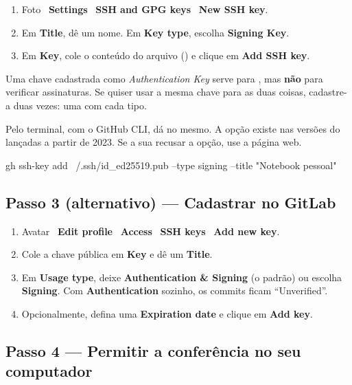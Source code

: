 \begin{enumerate}
  \item Foto \faChevronRight\ \textbf{Settings} \faChevronRight\ \textbf{SSH and GPG keys} \faChevronRight\ \textbf{New SSH key}.
  \item Em \textbf{Title}, dê um nome. Em \textbf{Key type}, escolha \textbf{Signing Key}.
  \item Em \textbf{Key}, cole o conteúdo do arquivo  () e clique em \textbf{Add SSH key}.
\end{enumerate}

\begin{atencao}
Uma chave cadastrada como \emph{Authentication Key} serve para , mas \textbf{não} para verificar assinaturas. Se quiser usar a mesma chave para as duas coisas, cadastre-a duas vezes: uma com cada tipo.
\end{atencao}

Pelo terminal, com o GitHub CLI, dá no mesmo. A opção  existe nas versões do  lançadas a partir de 2023. Se a sua recusar a opção, use a página web.

\begin{terminal}
gh ssh-key add ~/.ssh/id_ed25519.pub --type signing --title "Notebook pessoal"
\end{terminal}

\subsection{Passo 3 (alternativo) — Cadastrar no GitLab}

\begin{enumerate}
  \item Avatar \faChevronRight\ \textbf{Edit profile} \faChevronRight\ \textbf{Access} \faChevronRight\ \textbf{SSH keys} \faChevronRight\ \textbf{Add new key}.
  \item Cole a chave pública em \textbf{Key} e dê um \textbf{Title}.
  \item Em \textbf{Usage type}, deixe \textbf{Authentication \& Signing} (o padrão) ou escolha \textbf{Signing}. Com \textbf{Authentication} sozinho, os commits ficam \enquote{Unverified}.
  \item Opcionalmente, defina uma \textbf{Expiration date} e clique em \textbf{Add key}.
\end{enumerate}

\subsection{Passo 4 — Permitir a conferência no seu computador}

